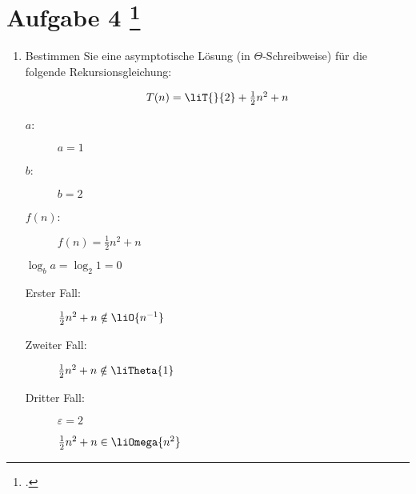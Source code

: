 \documentclass{lehramt-informatik-aufgabe}
\begin{document}
\let\j=\liJavaCode
\let\T=\liT

\section{Aufgabe 4
\footcite{66115:2020:09}}

\begin{enumerate}


\item Bestimmen Sie eine asymptotische Lösung (in $\Theta$-Schreibweise)
für die folgende Rekursionsgleichung:

\def\fn{\textstyle{\frac{1}{2}}n^2 + n}

\begin{displaymath}
T(n) = \T{}{2} + \fn
\end{displaymath}

\begin{liAntwort}

\liRekursionsGleichung

\begin{description}
\item[$a$:] $a = 1$
\item[$b$:] $b = 2$
\item[$f(n)$:] $f(n) = \fn$
\end{description}

$\log_b a = \log_2 1 = 0$

\begin{description}
\item[Erster Fall:]

\liBedingungEins

$\fn \notin \liO{n^{-1}}$

\item[Zweiter Fall:]

\liBedingungZwei

$\fn \notin \liTheta{1}$

\item[Dritter Fall:]

\liBedingungDrei

$\varepsilon = 2$

$\fn \in \liOmega{n^2}$
\end{description}

\end{liAntwort}

\end{enumerate}
\end{document}
